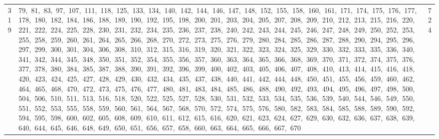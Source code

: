 \begin{longtable}{c|p{}|r}
319 & 79,\ 81,\ 83,\ 97,\ 107,\ 111,\ 118,\ 125,\ 133,\ 134,\ 140,\ 142,\ 144,\ 146,\ 147,\ 148,\ 152,\ 155,\ 158,\ 160,\ 161,\ 171,\ 174,\ 175,\ 176,\ 177,\ 178,\ 180,\ 182,\ 184,\ 186,\ 188,\ 189,\ 190,\ 192,\ 195,\ 198,\ 200,\ 201,\ 203,\ 204,\ 205,\ 207,\ 208,\ 209,\ 210,\ 212,\ 213,\ 215,\ 216,\ 220,\ 221,\ 222,\ 224,\ 225,\ 228,\ 230,\ 231,\ 232,\ 234,\ 235,\ 236,\ 237,\ 238,\ 240,\ 242,\ 243,\ 244,\ 245,\ 246,\ 247,\ 248,\ 249,\ 250,\ 252,\ 253,\ 255,\ 258,\ 259,\ 260,\ 261,\ 264,\ 265,\ 266,\ 268,\ 270,\ 272,\ 273,\ 275,\ 276,\ 279,\ 280,\ 284,\ 285,\ 286,\ 287,\ 288,\ 290,\ 294,\ 295,\ 296,\ 297,\ 299,\ 300,\ 301,\ 304,\ 306,\ 308,\ 310,\ 312,\ 315,\ 316,\ 319,\ 320,\ 321,\ 322,\ 323,\ 324,\ 325,\ 329,\ 330,\ 332,\ 333,\ 335,\ 336,\ 340,\ 341,\ 342,\ 344,\ 345,\ 348,\ 350,\ 351,\ 352,\ 354,\ 355,\ 356,\ 357,\ 360,\ 363,\ 364,\ 365,\ 366,\ 368,\ 369,\ 370,\ 371,\ 372,\ 374,\ 375,\ 376,\ 377,\ 378,\ 380,\ 384,\ 385,\ 387,\ 388,\ 390,\ 391,\ 392,\ 396,\ 399,\ 400,\ 402,\ 403,\ 405,\ 406,\ 407,\ 408,\ 410,\ 413,\ 414,\ 415,\ 416,\ 418,\ 420,\ 423,\ 424,\ 425,\ 427,\ 428,\ 429,\ 430,\ 432,\ 434,\ 435,\ 437,\ 438,\ 440,\ 441,\ 442,\ 444,\ 448,\ 450,\ 451,\ 455,\ 456,\ 459,\ 460,\ 462,\ 464,\ 465,\ 468,\ 470,\ 472,\ 473,\ 475,\ 476,\ 477,\ 480,\ 481,\ 483,\ 484,\ 485,\ 486,\ 488,\ 490,\ 492,\ 493,\ 494,\ 495,\ 496,\ 497,\ 498,\ 500,\ 504,\ 506,\ 510,\ 511,\ 513,\ 516,\ 518,\ 520,\ 522,\ 525,\ 527,\ 528,\ 530,\ 531,\ 532,\ 533,\ 534,\ 535,\ 536,\ 539,\ 540,\ 544,\ 546,\ 549,\ 550,\ 551,\ 552,\ 553,\ 555,\ 558,\ 559,\ 560,\ 561,\ 564,\ 567,\ 568,\ 570,\ 572,\ 574,\ 575,\ 576,\ 580,\ 582,\ 583,\ 584,\ 585,\ 588,\ 589,\ 590,\ 592,\ 594,\ 595,\ 598,\ 600,\ 602,\ 605,\ 608,\ 609,\ 610,\ 611,\ 612,\ 615,\ 616,\ 620,\ 621,\ 623,\ 624,\ 627,\ 629,\ 630,\ 632,\ 636,\ 637,\ 638,\ 639,\ 640,\ 644,\ 645,\ 646,\ 648,\ 649,\ 650,\ 651,\ 656,\ 657,\ 658,\ 660,\ 663,\ 664,\ 665,\ 666,\ 667,\ 670 & 724 \\

\end{longtable}
